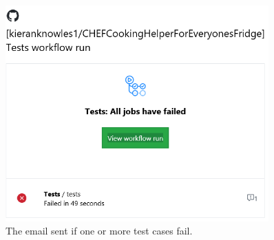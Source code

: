 \begin{figure}
  \centering
  \caption{\label{fig:test_failure}The email sent if one or more test cases fail.}
  \includegraphics[width=0.9\textwidth]{figures/test_failure.png}
\end{figure}
